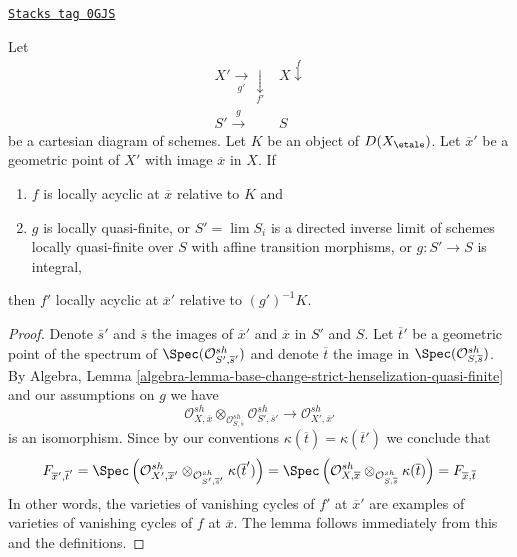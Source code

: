 \begin{lemma}
\label{etale-cohomology-lemma-locally-acyclic-quasi-finite-base-change}
\href{https://stacks.math.columbia.edu/tag/0GJS}{\texttt{Stacks tag 0GJS}}

Let
$$
\begin{array}{cc}X' \underset{g'}{\longrightarrow}\underset{f'}{\downarrow} & X \overset{f}{\downarrow} \\ S' \overset{g}{\longrightarrow} & S\end{array}
$$
be a cartesian diagram of schemes. Let $K$ be an object of $D(X_\etale)$.
Let $\overline{x}'$ be a geometric point of $X'$ with image $\overline{x}$
in $X$. If
\begin{enumerate}
\item $f$ is locally acyclic at $\overline{x}$ relative to $K$ and
\item $g$ is locally quasi-finite, or $S' = \lim S_i$
is a directed inverse limit of schemes locally quasi-finite over $S$
with affine transition morphisms, or $g : S' \to S$ is integral,
\end{enumerate}
then $f'$ locally acyclic at $\overline{x}'$ relative to $(g')^{-1}K$.
\end{lemma}

\begin{proof}
Denote $\overline{s}'$ and $\overline{s}$ the images of
$\overline{x}'$ and $\overline{x}$ in $S'$ and $S$.
Let $\overline{t}'$ be a geometric point of the spectrum of
$\Spec(\mathcal{O}^{sh}_{S', \overline{s}'})$ and denote
$\overline{t}$ the image in $\Spec(\mathcal{O}^{sh}_{S, \overline{s}})$.
By Algebra, Lemma
\ref{algebra-lemma-base-change-strict-henselization-quasi-finite}
and our assumptions on $g$ we have
$$
\mathcal{O}^{sh}_{X, \overline{x}}
\otimes_{\mathcal{O}^{sh}_{S, \overline{s}}}
\mathcal{O}^{sh}_{S', \overline{s}'}
\longrightarrow
\mathcal{O}^{sh}_{X', \overline{x}'}
$$
is an isomorphism. Since by our conventions
$\kappa(\overline{t}) = \kappa(\overline{t}')$
we conclude that
$$
F_{\overline{x}', \overline{t}'} =
\Spec\left(
\mathcal{O}^{sh}_{X', \overline{x}'}
\otimes_{\mathcal{O}^{sh}_{S', \overline{s}'}}
\kappa(\overline{t}')\right) =
\Spec\left(
\mathcal{O}^{sh}_{X, \overline{x}}
\otimes_{\mathcal{O}^{sh}_{S, \overline{s}}}
\kappa(\overline{t})\right) =
F_{\overline{x}, \overline{t}}
$$
In other words, the varieties of vanishing cycles
of $f'$ at $\overline{x}'$ are examples of varieties of vanishing
cycles of $f$ at $\overline{x}$. The lemma follows
immediately from this and the definitions.
\end{proof}


